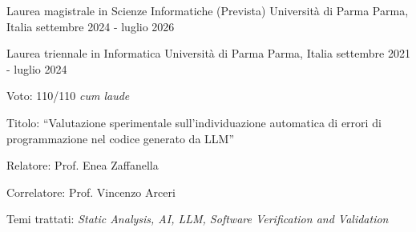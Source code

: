 

\begin{cventries}

	\cventry
		{Laurea magistrale in Scienze Informatiche (Prevista)} %
		{Università di Parma} %
		{Parma, Italia} %
		{settembre 2024 - luglio 2026} %
		{
		}
	
  \cventry
    {Laurea triennale in Informatica} %
    {Università di Parma} %
    {Parma, Italia} %
    {settembre 2021 - luglio 2024} %
    {
			\begin{cvitems-no-bullet} %
				\item {Voto: 110/110 \emph{cum laude}}
				\item {Titolo: \textquotedblleft{Valutazione sperimentale sull’individuazione automatica di errori di programmazione nel codice generato da LLM}\textquotedblright}
				\item {Relatore: Prof. Enea Zaffanella}
				\item {Correlatore: Prof. Vincenzo Arceri}
				\item {Temi trattati: \emph{Static Analysis, AI, LLM, Software Verification and Validation}}
      \end{cvitems-no-bullet}
    }

\end{cventries}
